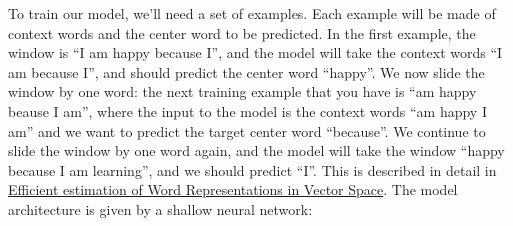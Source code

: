 \documentclass[12pt]{article}
\begin{document}
To train our model, we'll need a set of examples. Each example will be made of context words and the center word to be predicted. In the first example, the window is ``I am happy because I'', and the model will take the context words ``I am because I'', and should predict the center word ``happy''. We now slide the window by one word: the next training example that you have is ``am happy beause I am'', where the input to the model is the context words ``am happy I am'' and we want to predict the target center word ``because''. We continue to slide the window by one word again, and the model will take the window ``happy because I  am learning'', and we should predict ``I''.  This is described in detail in \href{https://arxiv.org/abs/1301.3781}{Efficient estimation of Word   Representations in Vector Space}. The model architecture is given by a shallow neural network:
\begin{figure}[h]
  \begin{center}
  \end{center}
\end{figure}
\end{document}
